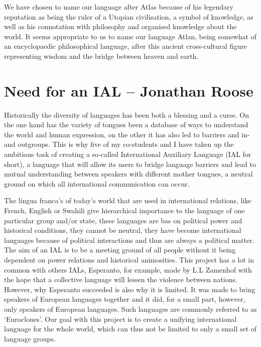 We have chosen to name our language after Atlas because of his legendary reputation as being the ruler of a Utopian civilisation, a symbol of knowledge, as well as his connotation with philosophy and organised knowledge about the world. It seems appropriate to us to name our language Atlan, being somewhat of an encyclopaedic philosophical language, after this ancient cross-cultural figure representing wisdom and the bridge between heaven \nopagebreak and earth. 


\section{Need for an IAL -- {\small Jonathan Roose}}
Historically the diversity of languages has been both a blessing and a curse. On the one hand has the variety of tongues been a database of ways to understand the world and human expression, on the other it has also led to barriers and in- and outgroups. This is why five of my co-students and I have taken up the ambitious task of creating a so-called International Auxiliary Language (IAL for short), a language that will allow its users to bridge language barriers and lead to mutual understanding between speakers with different mother tongues, a neutral ground on which all international communication can occur. 

The lingua franca’s of today's world that are used in international relations, like French, English or Swahili give hierarchical importance to the language of one particular group and/or state, these languages are bas on political power and historical conditions, they cannot be neutral, they have become international languages because of political interactions and thus are always a political matter. The aim of an IAL is to be a meeting ground of all people without it being dependent on power relations and historical animosities. This project has a lot in common with others IALs, Esperanto, for example, made by L.L Zamenhof with the hope that a collective language will lessen the violence between nations. However, why Esperanto succeeded is also why it is limited. It was made to bring speakers of European languages together and it did, for a small part, however, only speakers of European languages. Such languages are commonly referred to as ‘Euroclones’. Our goal with this project is to create a unifying international language for the whole world, which can thus not be limited to only a small set of language groups. 

